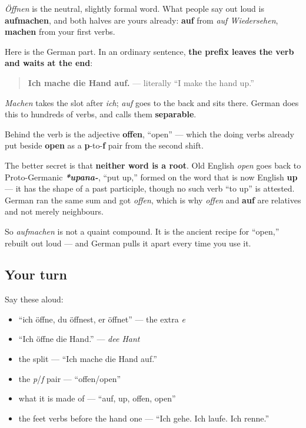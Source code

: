 \begin{grammarlens}[title={Grammar Lens: a verb that comes apart}]
\emph{Öffnen} is the neutral, slightly formal word. What people say out loud is \textbf{aufmachen}, and both halves are yours already: \textbf{auf} from \emph{auf Wiedersehen}, \textbf{machen} from your first verbs.

Here is the German part. In an ordinary sentence, \textbf{the prefix leaves the verb and waits at the end}:

\begin{quote}
\textbf{Ich mache die Hand auf.} — literally \textquotedblleft{}I make the hand up.\textquotedblright{}
\end{quote}

\emph{Machen} takes the slot after \emph{ich}; \emph{auf} goes to the back and sits there. German does this to hundreds of verbs, and calls them \textbf{separable}.
\end{grammarlens}

\begin{cousinweb}
Behind the verb is the adjective \textbf{offen}, \textquotedblleft{}open\textquotedblright{} — which the doing verbs already put beside \textbf{open} as a \textbf{p}-to-\textbf{f} pair from the second shift.

The better secret is that \textbf{neither word is a root}. Old English \emph{open} goes back to Proto-Germanic \emph{\textbf{*upana-}}, \textquotedblleft{}put up,\textquotedblright{} formed on the word that is now English \textbf{up} — it has the shape of a past participle, though no such verb \textquotedblleft{}to up\textquotedblright{} is attested. German ran the same sum and got \emph{offen}, which is why \emph{offen} and \textbf{auf} are relatives and not merely neighbours.

So \emph{aufmachen} is not a quaint compound. It is the ancient recipe for \textquotedblleft{}open,\textquotedblright{} rebuilt out loud — and German pulls it apart every time you use it.
\end{cousinweb}

\subsection*{Your turn}
Say these aloud:

\begin{itemize}
\raggedright
  \item \textquotedblleft{}ich öffne, du öffnest, er öffnet\textquotedblright{} — the extra \emph{e}
  \item \textquotedblleft{}Ich öffne die Hand.\textquotedblright{} — \emph{dee Hant}
  \item the split — \textquotedblleft{}Ich mache die Hand auf.\textquotedblright{}
  \item the \emph{p}/\emph{f} pair — \textquotedblleft{}offen/open\textquotedblright{}
  \item what it is made of — \textquotedblleft{}auf, up, offen, open\textquotedblright{}
  \item the feet verbs before the hand one — \textquotedblleft{}Ich gehe. Ich laufe. Ich renne.\textquotedblright{}
\end{itemize}

